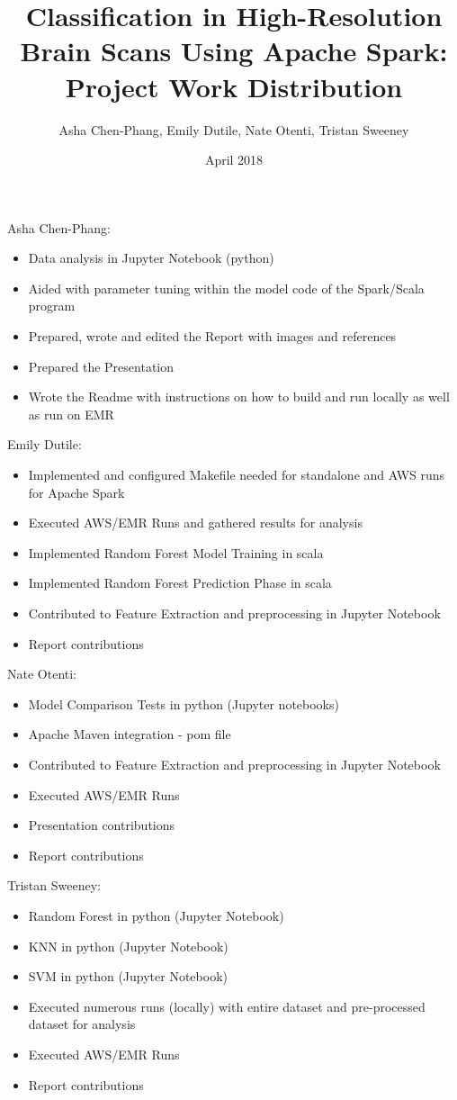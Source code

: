 \documentclass{neu_handout}
\title{Classification in High-Resolution Brain Scans Using Apache Spark: Project Work Distribution}
\author{Asha Chen-Phang, Emily Dutile, Nate Otenti, Tristan Sweeney}
\date{April 2018}
\begin{document}
\newenvironment{myitemize}
{ \begin{itemize}
    \setlength{\itemsep}{0pt}
    \setlength{\parskip}{0pt}
    \setlength{\parsep}{0pt}     }
{ \end{itemize}                  } 

Asha Chen-Phang:
\begin{myitemize}
  \item Data analysis in Jupyter Notebook (python)
   \item Aided with parameter tuning within the model code of the Spark/Scala program
  \item Prepared, wrote and edited the Report with images and references
  \item Prepared the Presentation
   \item Wrote the Readme with instructions on how to build and run locally as well as run on EMR
\end{myitemize}



Emily Dutile:
\begin{myitemize}
  \item Implemented and configured Makefile needed for standalone and AWS runs for Apache Spark
  \item Executed AWS/EMR Runs and gathered results for analysis
  \item Implemented Random Forest Model Training in scala
  \item Implemented Random Forest Prediction Phase in scala
\item Contributed to Feature Extraction and preprocessing in Jupyter Notebook
  \item Report contributions
\end{myitemize}



Nate Otenti:
\begin{myitemize}
  \item Model Comparison Tests in python (Jupyter notebooks)
   \item Apache Maven integration - pom file
    \item Contributed to Feature Extraction and preprocessing in Jupyter Notebook
   \item Executed AWS/EMR Runs
   \item Presentation contributions
  \item Report contributions
\end{myitemize}



Tristan Sweeney:
\begin{myitemize}
  \item Random Forest in python (Jupyter Notebook)
  \item KNN in python (Jupyter Notebook)
  \item SVM in python (Jupyter Notebook)
  \item Executed numerous runs (locally) with entire dataset and pre-processed dataset for analysis
  \item Executed AWS/EMR Runs
  \item Report contributions
\end{myitemize}
\end{document}
